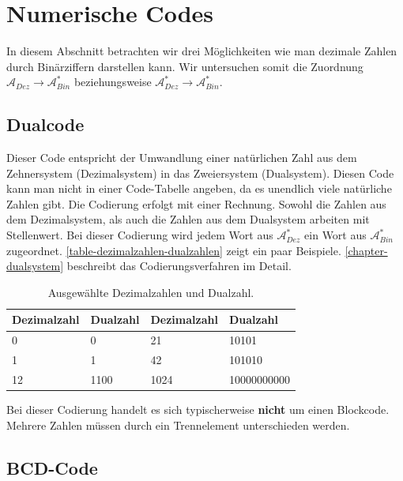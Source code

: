 \section{Numerische Codes}

In diesem Abschnitt betrachten wir drei Möglichkeiten wie man dezimale Zahlen durch Binärziffern darstellen kann. Wir untersuchen somit die Zuordnung $\mathscr{A}_{Dez} \rightarrow \mathscr{A}_{Bin}^*$ beziehungsweise $\mathscr{A}_{Dez}^* \rightarrow \mathscr{A}_{Bin}^*$.

\subsection{Dualcode}

Dieser Code entspricht der Umwandlung einer natürlichen Zahl aus dem Zehnersystem (Dezimalsystem) in das Zweiersystem (Dualsystem). Diesen Code kann man nicht in einer Code-Tabelle angeben, da es unendlich viele natürliche Zahlen gibt. Die Codierung erfolgt mit einer Rechnung. Sowohl die Zahlen aus dem Dezimalsystem, als auch die Zahlen aus dem Dualsystem arbeiten mit Stellenwert.
Bei dieser Codierung wird jedem Wort aus $\mathscr{A}_{Dez}^*$ ein Wort aus $\mathscr{A}_{Bin}^*$ zugeordnet. \autoref{table-dezimalzahlen-dualzahlen} zeigt ein paar Beispiele. \autoref{chapter-dualsystem} beschreibt das Codierungsverfahren im Detail.

\begin{table}[htb]
\centering
\begin{tabular}{|l|l|l|l|}
\hline
Dezimalzahl & Dualzahl & Dezimalzahl & Dualzahl    \\ \hline
0           & 0        & 21          & 10101       \\ \hline
1           & 1        & 42          & 101010      \\ \hline
12          & 1100     & 1024        & 10000000000 \\ \hline
\end{tabular}
\caption{Ausgewählte Dezimalzahlen und Dualzahl.}
\label{table-dezimalzahlen-dualzahlen}
\end{table}

Bei dieser Codierung handelt es sich typischerweise \textbf{nicht} um einen Blockcode. Mehrere Zahlen müssen durch ein  Trennelement unterschieden werden.

\subsection{BCD-Code}

